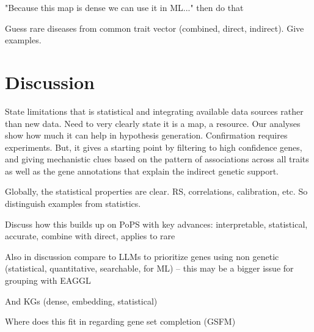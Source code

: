 \documentclass[sn-nature,lineno]{sn-jnl}%
\theoremstyle{thmstyleone}%
\theoremstyle{thmstyletwo}%
\theoremstyle{thmstylethree}%
\begin{document}
"Because this map is dense we can use it in ML..." then do that

Guess rare diseases from common trait vector (combined, direct, indirect). Give examples.

\section{Discussion}

State limitations that is statistical and integrating available data sources rather than new data. Need to very clearly state it is a map, a resource. Our analyses show how much it can help in hypothesis generation. Confirmation requires experiments. But, it gives a starting point by filtering to high confidence genes, and giving mechanistic clues based on the pattern of associations across all traits as well as the gene annotations that explain the indirect genetic support.

Globally, the statistical properties are clear. RS, correlations, calibration, etc. So distinguish examples from statistics.

Discuss how this builds up on PoPS with key advances: interpretable, statistical, accurate, combine with direct, applies to rare

Also in discussion compare to LLMs to prioritize genes using non genetic (statistical, quantitative, searchable, for ML) -- this may be a bigger issue for grouping with EAGGL

And KGs (dense, embedding, statistical)

Where does this fit in regarding gene set completion (GSFM)
\end{document}
